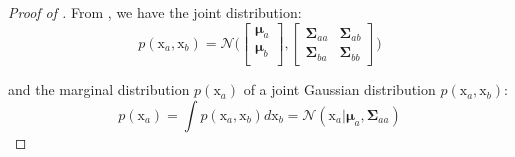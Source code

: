 \documentclass{article}
\begin{document}
\begin{proof}[Proof of ]\label{proof:HBM}
From \citep{deisenroth2020mathematics}, we have the joint distribution:
\begin{equation}
  p(\bm{\mathrm{x}}_{a}, \bm{\mathrm{x}}_{b}) = \mathcal{N}\Bigg(
  \begin{bmatrix}
    \bm{\mu}_{a} \\
    \bm{\mu}_{b} \\
  \end{bmatrix},
  \begin{bmatrix}
    \bm{\Sigma}_{aa} & \bm{\Sigma}_{ab}  \\
    \bm{\Sigma}_{ba} & \bm{\Sigma}_{bb}
  \end{bmatrix}
  \Bigg)\label{eq:joint-distrib}
\end{equation}

and the marginal distribution $p(\bm{\mathrm{x}}_{a})$ of a joint Gaussian distribution $p(\bm{\mathrm{x}}_{a}, \bm{\mathrm{x}}_{b})$:
\begin{equation}
  p(\bm{\mathrm{x}}_{a}) = \int p(\bm{\mathrm{x}}_{a}, \bm{\mathrm{x}}_{b}) d \bm{\mathrm{x}}_{b} = \mathcal{N}( \bm{\mathrm{x}}_{a} | \bm{\mu}_{a}, \bm{\Sigma}_{aa})
\end{equation}


\end{proof}
\end{document}
